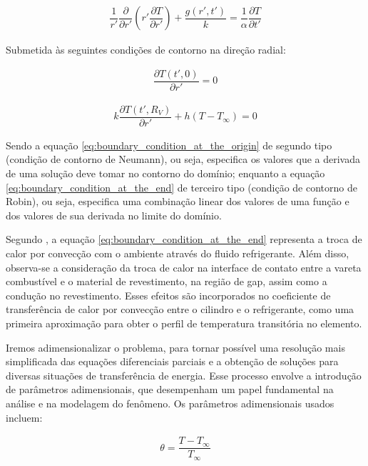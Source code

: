 \begin{gather}
    \dfrac{1}{r '} \dfrac{\partial}{\partial r '} \left( r ' \dfrac{\partial T}{\partial r '} \right) + \dfrac{g(r ', t ')}{k} = \dfrac{1}{\alpha} \dfrac{\partial T}{\partial t '}
    \label{eq:heat_equation}
\end{gather}

Submetida às seguintes condições de contorno na direção radial:

\begin{gather}
    \dfrac{\partial T (t ' , 0)}{\partial r '} = 0
    \label{eq:boundary_condition_at_the_origin}
\end{gather}

\begin{gather}
    k \dfrac{\partial T (t ' , R_V )}{\partial r '} + h \left( T - T _\infty \right) = 0
    \label{eq:boundary_condition_at_the_end}
\end{gather}

Sendo a equação \ref{eq:boundary_condition_at_the_origin} de segundo tipo (condição de contorno de Neumann), ou seja, especifica os valores que a derivada de uma solução deve tomar no contorno do domínio; enquanto a equação \ref{eq:boundary_condition_at_the_end} de terceiro tipo (condição de contorno de Robin), ou seja, especifica uma combinação linear dos valores de uma função e dos valores de sua derivada no limite do domínio.

Segundo \citet{soares2017}, a equação \ref{eq:boundary_condition_at_the_end} representa a troca de calor por convecção com o ambiente através do fluido refrigerante. Além disso, observa-se a consideração da troca de calor na interface de contato entre a vareta combustível e o material de revestimento, na região de gap, assim como a condução no revestimento. Esses efeitos são incorporados no coeficiente de transferência de calor por convecção entre o cilindro e o refrigerante, como uma primeira aproximação para obter o perfil de temperatura transitória no elemento.

Iremos adimensionalizar o problema, para tornar possível uma resolução mais simplificada das equações diferenciais parciais e a obtenção de soluções para diversas situações de transferência de energia. Esse processo envolve a introdução de parâmetros adimensionais, que desempenham um papel fundamental na análise e na modelagem do fenômeno. Os parâmetros adimensionais usados incluem:

\begin{gather}
    \theta = \dfrac{T - T_ \infty}{T_ \infty}
\end{gather}

